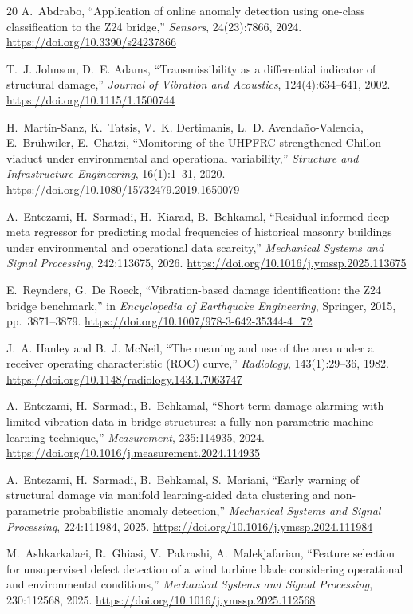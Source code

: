 \documentclass[11pt,a4paper]{article}
\begin{document}
\begin{thebibliography}{20}
A.~Abdrabo,
``Application of online anomaly detection using one-class classification to
the Z24 bridge,''
\emph{Sensors}, 24(23):7866, 2024.
\url{https://doi.org/10.3390/s24237866}

T.~J. Johnson, D.~E. Adams,
``Transmissibility as a differential indicator of structural damage,''
\emph{Journal of Vibration and Acoustics}, 124(4):634--641, 2002.
\url{https://doi.org/10.1115/1.1500744}

\color{red}
H.~Mart\'in-Sanz, K.~Tatsis, V.~K. Dertimanis, L.~D. Avenda\~no-Valencia,
E.~Br\"uhwiler, E.~Chatzi,
``Monitoring of the UHPFRC strengthened Chillon viaduct under environmental
and operational variability,''
\emph{Structure and Infrastructure Engineering}, 16(1):1--31, 2020.
\url{https://doi.org/10.1080/15732479.2019.1650079}

A.~Entezami, H.~Sarmadi, H.~Kiarad, B.~Behkamal,
``Residual-informed deep meta regressor for predicting modal frequencies of
historical masonry buildings under environmental and operational data
scarcity,''
\emph{Mechanical Systems and Signal Processing}, 242:113675, 2026.
\url{https://doi.org/10.1016/j.ymssp.2025.113675}
\color{black}

E.~Reynders, G.~De Roeck,
``Vibration-based damage identification: the Z24 bridge benchmark,''
in \emph{Encyclopedia of Earthquake Engineering}, Springer, 2015,
pp.~3871--3879.
\url{https://doi.org/10.1007/978-3-642-35344-4_72}

J.~A. Hanley and B.~J. McNeil,
``The meaning and use of the area under a receiver operating characteristic
(ROC) curve,''
\emph{Radiology}, 143(1):29--36, 1982.
\url{https://doi.org/10.1148/radiology.143.1.7063747}

\color{red}
A.~Entezami, H.~Sarmadi, B.~Behkamal,
``Short-term damage alarming with limited vibration data in bridge
structures: a fully non-parametric machine learning technique,''
\emph{Measurement}, 235:114935, 2024.
\url{https://doi.org/10.1016/j.measurement.2024.114935}

A.~Entezami, H.~Sarmadi, B.~Behkamal, S.~Mariani,
``Early warning of structural damage via manifold learning-aided data
clustering and non-parametric probabilistic anomaly detection,''
\emph{Mechanical Systems and Signal Processing}, 224:111984, 2025.
\url{https://doi.org/10.1016/j.ymssp.2024.111984}

M.~Ashkarkalaei, R.~Ghiasi, V.~Pakrashi, A.~Malekjafarian,
``Feature selection for unsupervised defect detection of a wind turbine
blade considering operational and environmental conditions,''
\emph{Mechanical Systems and Signal Processing}, 230:112568, 2025.
\url{https://doi.org/10.1016/j.ymssp.2025.112568}
\color{black}

\end{thebibliography}
\end{document}
